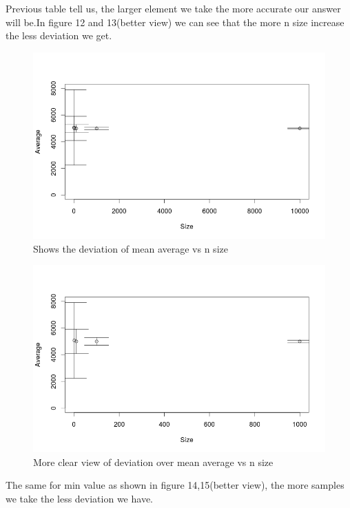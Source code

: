 \documentclass{article}
\begin{document}
	Previous table tell us, the larger element we take the more accurate our answer will be.In figure 12 and 13(better view) we can see that the more n size increase the less deviation we get.
	\begin{figure}[H]
		\begin{center}
			\includegraphics[scale=0.7]{plotmeanall.png}
		\end{center}
		\caption{Shows the deviation of mean average vs n size}
	\end{figure}
	\begin{figure}[H]
		\begin{center}
			\includegraphics[scale=0.6]{plotmean4.png}
		\end{center}
		\caption{More clear view of deviation over mean average vs n size}
	\end{figure}
	The same for min value as shown in figure 14,15(better view), the more samples we take the less deviation we have.
\end{document}
